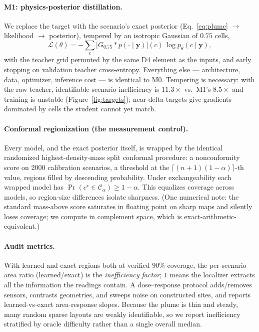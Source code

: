 \documentclass{article}
\begin{document}
\paragraph{M1: physics-posterior distillation.} We replace the target with the scenario's
exact posterior (Eq.~\eqref{eq:plume} $\to$ likelihood $\to$ posterior), tempered by an
isotropic Gaussian of $0.75$ cells,
\begin{equation}
\mathcal{L}(\theta) = -\sum_c \big[G_{0.75} * p(\cdot\mid\boldsymbol{y})\big](c)\,
\log p_\theta(c\mid\boldsymbol{y}),
\label{eq:distill}
\end{equation}
with the teacher grid permuted by the same D4 element as the inputs, and early stopping on
validation teacher cross-entropy. Everything else --- architecture, data, optimizer,
inference cost --- is identical to M0. Tempering is necessary: with the raw teacher,
identifiable-scenario inefficiency is $11.3\times$ vs.\ M1's $8.5\times$ and training is
unstable (Figure~\ref{fig:targets}); near-delta targets give gradients dominated by cells
the student cannot yet match.

\paragraph{Conformal regionization (the measurement control).} Every model, and the exact
posterior itself, is wrapped by the identical randomized highest-density-mass split
conformal procedure: a nonconformity score on 2000 calibration scenarios, a threshold at
the $\lceil(n{+}1)(1{-}\alpha)\rceil$-th value, regions filled by descending probability.
Under exchangeability each wrapped model has $\Pr(c^\star \in \mathcal{C}_\alpha) \geq
1-\alpha$. This equalizes coverage across models, so region-size differences isolate
sharpness. (One numerical note: the standard mass-above score saturates in floating point
on sharp maps and silently loses coverage; we compute in complement space, which is
exact-arithmetic-equivalent.)

\paragraph{Audit metrics.} With learned and exact regions both at verified $90\%$ coverage,
the per-scenario area ratio (learned/exact) is the \emph{inefficiency factor}; $1$ means
the localizer extracts all the information the readings contain. A dose--response protocol
adds/removes sensors, contrasts geometries, and sweeps noise on constructed sites, and
reports learned-vs-exact area-response slopes. Because the plume is thin and steady, many
random sparse layouts are weakly identifiable, so we report inefficiency stratified by
oracle difficulty rather than a single overall median.
\end{document}
